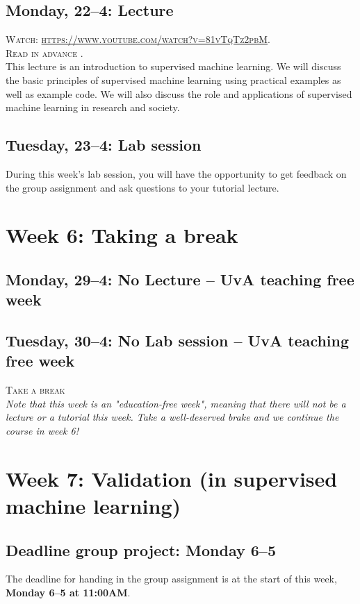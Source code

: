 {\subsection*{Monday, 22--4: Lecture}
\textsc{ Watch: \url{https://www.youtube.com/watch?v=81vTqTz2pbM}.}\\
\textsc{ Read in advance \cite{van_zoonen_social_2016}.}\\

This lecture is an introduction to supervised machine learning. We will discuss the basic principles of supervised machine learning using practical examples as well as example code. We will also discuss the role and applications of supervised machine learning in research and society.

\subsection*{Tuesday, 23--4: Lab session}
During this week's lab session, you will have the opportunity to get feedback on the group assignment and ask questions to your tutorial lecture. 

\section*{Week 6: Taking a break}

\subsection*{Monday, 29--4: No Lecture -- UvA teaching free week}
\subsection*{Tuesday, 30--4: No Lab session -- UvA teaching free week}

\textsc{ Take a break}\\

\emph{Note that this week is an "education-free week", meaning that there will not be a lecture or a tutorial this week. Take a well-deserved brake and we continue the course in week 6!}

\section*{Week 7: Validation (in supervised machine learning)}

\subsection*{Deadline group project: Monday 6--5}
The deadline for handing in the group assignment is at the start of this week, \textbf{Monday 6--5 at 11:00AM}.

}
